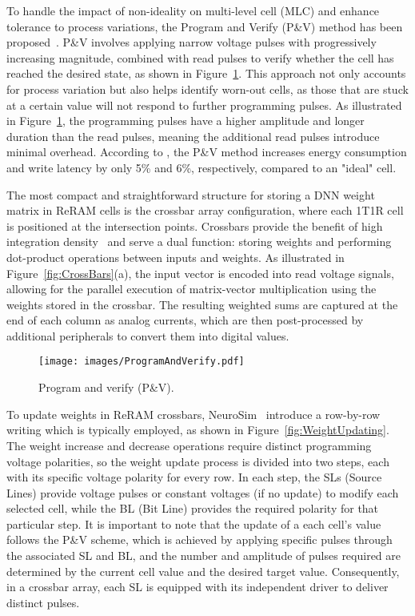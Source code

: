 To handle the impact of non-ideality on multi-level cell (MLC) and enhance tolerance to process variations, the Program and Verify (P\&V) method has been proposed~\cite{Accurate_Program_Verify,ISPVA}. P\&V involves applying narrow voltage pulses with progressively increasing magnitude, combined with read pulses to verify whether the cell has reached the desired state, as shown in Figure~\ref{fig:P&V}. This approach not only accounts for process variation but also helps identify worn-out cells, as those that are stuck at a certain value will not respond to further programming pulses. As illustrated in Figure~\ref{fig:P&V}, the programming pulses have a higher amplitude and longer duration than the read pulses, meaning the additional read pulses introduce minimal overhead. According to \cite{Assist_Techniques}, the P\&V method increases energy consumption and write latency by only 5\% and 6\%, respectively, compared to an "ideal" cell.

The most compact and straightforward structure for storing a DNN weight matrix in ReRAM cells is the crossbar array configuration, where each 1T1R cell is positioned at the intersection points. Crossbars provide the benefit of high integration density~\cite{NeuroSim_writing} and serve a dual function: storing weights and performing dot-product operations between inputs and weights. As illustrated in Figure~\ref{fig:CrossBars}(a), the input vector is encoded into read voltage signals, allowing for the parallel execution of matrix-vector multiplication using the weights stored in the crossbar. The resulting weighted sums are captured at the end of each column as analog currents, which are then post-processed by additional peripherals to convert them into digital values.

\begin{figure}[t!]
    \centering
    \texttt{[image: images/ProgramAndVerify.pdf]}
    \caption{Program and verify (P\&V).}
    \label{fig:P&V}
\end{figure}

To update weights in ReRAM crossbars, NeuroSim~\cite{NeuroSim_writing} introduce a row-by-row writing which is typically employed, as shown in Figure~\ref{fig:WeightUpdating}. The weight increase and decrease operations require distinct programming voltage polarities, so the weight update process is divided into two steps, each with its specific voltage polarity for every row. In each step, the SLs (Source Lines) provide voltage pulses or constant voltages (if no update) to modify each selected cell, while the BL (Bit Line) provides the required polarity for that particular step. It is important to note that the update of a each cell's value follows the P\&V scheme, which is achieved by applying specific pulses through the associated SL and BL, and the number and amplitude of pulses required are determined by the current cell value and the desired target value. Consequently, in a crossbar array, each SL is equipped with its independent driver to deliver distinct pulses.

